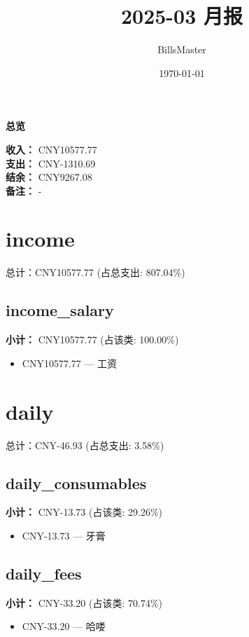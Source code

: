 \documentclass[12pt]{article}
\title{2025-03 月报}
\author{BillsMaster}
\date{\today}
\begin{document}
\maketitle

\vspace{1em}
\hrulefill
\begin{center}
    {\Large\bfseries 总览}\par\vspace{1em}
    {\large
    \textbf{收入：} CNY10577.77\\
    \textbf{支出：} CNY-1310.69\\
    \textbf{结余：} CNY9267.08\\
    \textbf{备注：} -
    }
\end{center}
\hrulefill

\section*{income}
总计：CNY10577.77 	 (占总支出: 807.04\%)

\subsection*{income\_salary}
\textbf{小计：} CNY10577.77 (占该类: 100.00\%)
\begin{itemize}
    \item CNY10577.77 --- 工资
\end{itemize}
\section*{daily}
总计：CNY-46.93 	 (占总支出: 3.58\%)

\subsection*{daily\_consumables}
\textbf{小计：} CNY-13.73 (占该类: 29.26\%)
\begin{itemize}
    \item CNY-13.73 --- 牙膏
\end{itemize}
\subsection*{daily\_fees}
\textbf{小计：} CNY-33.20 (占该类: 70.74\%)
\begin{itemize}
    \item CNY-33.20 --- 哈喽
\end{itemize}
\end{document}
